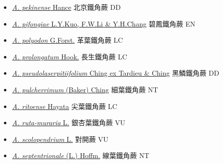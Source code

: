\begin{itemize}
\begin{itemize}
        \item[] \href{http://www.theplantlist.org/tpl1.1/search?q=Asplenium+pekinense}{\textit{A. pekinense} Hance}   北京鐵角蕨   DD
        \item[] \href{http://www.theplantlist.org/tpl1.1/search?q=Asplenium+pifongiae}{\textit{A. pifongiae} L.Y.Kuo, F.W.Li \& Y.H.Chang}   碧鳳鐵角蕨   EN
        \item[] \href{http://www.theplantlist.org/tpl1.1/search?q=Asplenium+polyodon}{\textit{A. polyodon} G.Forst.}   革葉鐵角蕨   LC
        \item[] \href{http://www.theplantlist.org/tpl1.1/search?q=Asplenium+prolongatum}{\textit{A. prolongatum} Hook.}   長生鐵角蕨   LC
        \item[] \href{http://www.theplantlist.org/tpl1.1/search?q=Asplenium+pseudolaserpitiifolium}{\textit{A. pseudolaserpitiifolium} Ching ex Tardieu \& Ching}   黑鱗鐵角蕨   DD
        \item[] \href{http://www.theplantlist.org/tpl1.1/search?q=Asplenium+pulcherrimum}{\textit{A. pulcherrimum} (Baker) Ching}   細葉鐵角蕨   NT
        \item[] \href{http://www.theplantlist.org/tpl1.1/search?q=Asplenium+ritoense}{\textit{A. ritoense} Hayata}   尖葉鐵角蕨   LC
        \item[] \href{http://www.theplantlist.org/tpl1.1/search?q=Asplenium+ruta-muraria}{\textit{A. ruta-muraria} L.}   銀杏葉鐵角蕨   VU
        \item[] \href{http://www.theplantlist.org/tpl1.1/search?q=Asplenium+scolopendrium}{\textit{A. scolopendrium} L.}   對開蕨   VU
        \item[] \href{http://www.theplantlist.org/tpl1.1/search?q=Asplenium+septentrionale}{\textit{A. septentrionale} (L.) Hoffm.}   線葉鐵角蕨   NT

\end{itemize}
\end{itemize}
